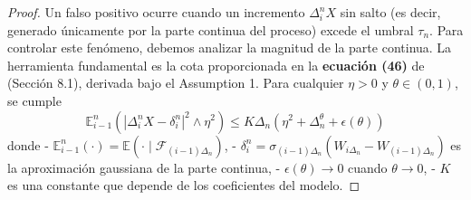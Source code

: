\documentclass[
  spanish,
  us-letterpaper,
]{scrreprt}
\theoremstyle{plain}
\theoremstyle{plain}
\theoremstyle{definition}
\theoremstyle{remark}
\begin{document}
\begin{proof}
Un falso positivo ocurre cuando un incremento \(\Delta_i^n X\) sin salto
(es decir, generado únicamente por la parte continua del proceso) excede
el umbral \(\tau_n\). Para controlar este fenómeno, debemos analizar la
magnitud de la parte continua. La herramienta fundamental es la cota
proporcionada en la \textbf{ecuación (46)} de \cite{ait2009testing}
(Sección 8.1), derivada bajo el Assumption 1. Para cualquier
\(\eta > 0\) y \(\theta \in (0,1)\), se cumple
\[ \mathbb{E}_{i-1}^n \left( |\Delta_i^n X - \delta_i^n|^2 \wedge \eta^2 \right) \leq K \Delta_n (\eta^2 + \Delta_n^{\theta} + \epsilon(\theta))
 \] donde -
\(\mathbb{E}_{i-1}^n(\cdot) = \mathbb{E}(\cdot \mid \mathcal{F}_{(i-1)\Delta_n})\),
-
\(\delta_i^n = \sigma_{(i-1)\Delta_n} (W_{i\Delta_n} - W_{(i-1)\Delta_n})\)
es la aproximación gaussiana de la parte continua, -
\(\epsilon(\theta) \to 0\) cuando \(\theta \to 0\), - \(K\) es una
constante que depende de los coeficientes del modelo.


\end{proof}
\end{document}
